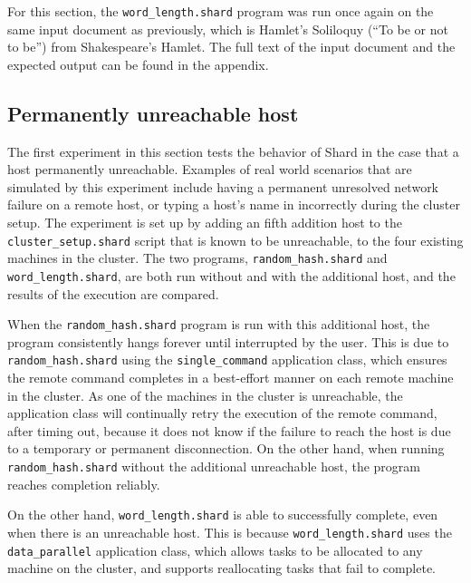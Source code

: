 \documentclass[twoside]{report}
\newcommand{\todoi}[1]{\todo[inline, color=blue!20]{TODO: {#1}}}
\begin{document}
For this section, the \texttt{word\_length.shard} program was run once again on the same input document as previously, which is Hamlet's Soliloquy (``To be or not to be'') from Shakespeare's Hamlet.
The full text of the input document and the expected output can be found in the appendix.

\subsection{Permanently unreachable host}
The first experiment in this section tests the behavior of Shard in the case that a host permanently unreachable.
Examples of real world scenarios that are simulated by this experiment include having a permanent unresolved network failure on a remote host, or typing a host's name in incorrectly during the cluster setup.
The experiment is set up by adding an fifth addition host to the \texttt{cluster\_setup.shard} script that is known to be unreachable, to the four existing machines in the cluster.
The two programs, \texttt{random\_hash.shard} and \texttt{word\_length.shard}, are both run without and with the additional host, and the results of the execution are compared.

When the \texttt{random\_hash.shard} program is run with this additional host, the program consistently hangs forever until interrupted by the user.
This is due to \texttt{random\_hash.shard} using the \texttt{single\_command} application class, which ensures the remote command completes in a best-effort manner on each remote machine in the cluster.
As one of the machines in the cluster is unreachable, the application class will continually retry the execution of the remote command, after timing out, because it does not know if the failure to reach the host is due to a temporary or permanent disconnection.
On the other hand, when running \texttt{random\_hash.shard} without the additional unreachable host, the program reaches completion reliably.


On the other hand, \texttt{word\_length.shard} is able to successfully complete, even when there is an unreachable host.
This is because \texttt{word\_length.shard} uses the \texttt{data\_parallel} application class, which allows tasks to be allocated to any machine on the cluster, and supports reallocating tasks that fail to complete.
\end{document}
